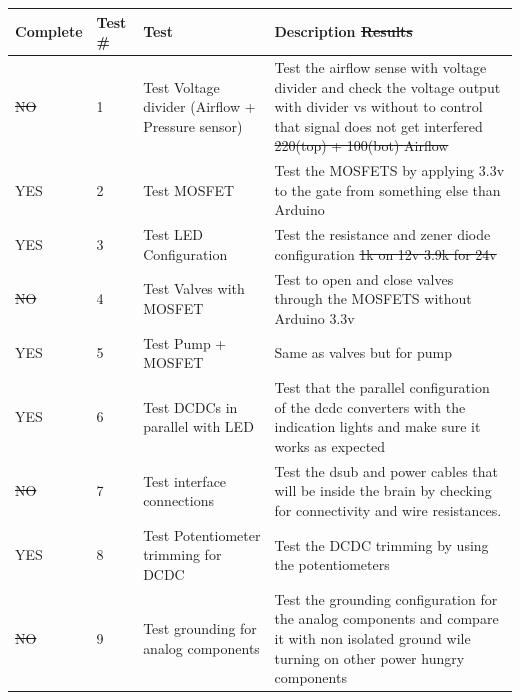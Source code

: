 \documentclass[a4paper,12pt,oneside]{article} %
\providecommand{\DIFaddtex}[1]{{\protect\color{blue}\uwave{#1}}} %
\providecommand{\DIFdeltex}[1]{{\protect\color{red}\sout{#1}}}                      %
\providecommand{\DIFdelbegin}{} %
\providecommand{\DIFaddFL}[1]{\DIFadd{#1}} %
\providecommand{\DIFdelFL}[1]{\DIFdel{#1}} %
\providecommand{\DIFaddbeginFL}{} %
\providecommand{\DIFaddendFL}{} %
\providecommand{\DIFdelbeginFL}{} %
\providecommand{\DIFdelendFL}{} %
\providecommand{\DIFadd}[1]{\texorpdfstring{\DIFaddtex{#1}}{#1}} %
\providecommand{\DIFdel}[1]{\texorpdfstring{\DIFdeltex{#1}}{}} %
\newcommand{\DIFscaledelfig}{0.5}
\newlength{\DIFdelgraphicswidth} %
\newlength{\DIFdelgraphicsheight} %
\newcommand{\DIFaddincludegraphics}[2][]{{\color{blue}\fbox{\DIFOincludegraphics[#1]{#2}}}} %
\newcommand{\DIFdelincludegraphics}[2][]{%
\sbox{\DIFdelgraphicsbox}{\DIFOincludegraphics[#1]{#2}}%
\settoboxwidth{\DIFdelgraphicswidth}{\DIFdelgraphicsbox} %
\settoboxtotalheight{\DIFdelgraphicsheight}{\DIFdelgraphicsbox} %
\scalebox{\DIFscaledelfig}{%
\parbox[b]{\DIFdelgraphicswidth}{\usebox{\DIFdelgraphicsbox}\\[-\baselineskip] \rule{\DIFdelgraphicswidth}{0em}}\llap{\resizebox{\DIFdelgraphicswidth}{\DIFdelgraphicsheight}{%
\setlength{\unitlength}{\DIFdelgraphicswidth}%
\begin{picture}(1,1)%
\thicklines\linethickness{2pt} %
{\color[rgb]{1,0,0}\put(0,0){\framebox(1,1){}}}%
{\color[rgb]{1,0,0}\put(0,0){\line( 1,1){1}}}%
{\color[rgb]{1,0,0}\put(0,1){\line(1,-1){1}}}%
\end{picture}%
}\hspace*{3pt}}} %
} %
\DeclareRobustCommand{\DIFdelbegin}{\DIFOdelbegin \let\includegraphics\DIFdelincludegraphics} %
\DeclareRobustCommand{\DIFaddbeginFL}{\DIFOaddbeginFL \let\includegraphics\DIFaddincludegraphics} %
\DeclareRobustCommand{\DIFaddendFL}{\DIFOaddendFL \let\includegraphics\DIFOincludegraphics} %
\DeclareRobustCommand{\DIFdelbeginFL}{\DIFOdelbeginFL \let\includegraphics\DIFdelincludegraphics} %
\DeclareRobustCommand{\DIFdelendFL}{\DIFOaddendFL \let\includegraphics\DIFOincludegraphics} %
\begin{document}
\begin{appendices}
\DIFdelbegin %
\DIFdelendFL \DIFaddbeginFL \begin{longtable}{|m{}|m{}|m{}|m{}|}
\DIFaddendFL \hline
Complete & Test \# & Test & Description \DIFdelbeginFL %
\DIFdelFL{Results }\DIFdelendFL \\ \hline
\DIFdelbeginFL \DIFdelFL{NO }\DIFdelendFL \DIFaddbeginFL \DIFaddFL{YES }\DIFaddendFL & 1 & Test Voltage divider (Airflow + Pressure sensor) & Test the airflow sense with voltage divider and check the voltage output with divider vs without to control that signal does not get interfered \DIFdelbeginFL %
\DIFdelFL{220(top) + 100(bot) Airflow }\DIFdelendFL \\ \hline
YES & 2 & Test MOSFET & Test the MOSFETS by applying 3.3v to the gate from something else than Arduino \DIFdelbeginFL %
\DIFdelendFL \\ \hline
YES & 3 & Test LED Configuration & Test the resistance and zener diode configuration\DIFdelbeginFL %
\DIFdelFL{1k on 12v  3.9k for 24v }\DIFdelendFL \\ \hline
\DIFdelbeginFL \DIFdelFL{NO }\DIFdelendFL \DIFaddbeginFL \DIFaddFL{YES }\DIFaddendFL & 4 & Test Valves with MOSFET & Test to open and close valves through the MOSFETS without Arduino 3.3v  \DIFdelbeginFL %
\DIFdelendFL \\ \hline
YES & 5 & Test Pump + MOSFET & Same as valves but for pump  \DIFdelbeginFL %
\DIFdelendFL \\ \hline
YES & 6 & Test DCDCs in parallel with LED & Test that the parallel configuration of the dcdc converters with the indication lights and make sure it works as expected  \DIFdelbeginFL %
\DIFdelendFL \\ \hline
\DIFdelbeginFL \DIFdelFL{NO }\DIFdelendFL \DIFaddbeginFL \DIFaddFL{YES }\DIFaddendFL & 7 & Test interface connections & Test the dsub and power cables that will be inside the brain by checking for connectivity and wire resistances.  \DIFdelbeginFL %
\DIFdelendFL \\ \hline
YES & 8 & Test Potentiometer trimming for DCDC & Test the DCDC trimming by using the potentiometers \DIFdelbeginFL %
\DIFdelendFL \\ \hline
\DIFdelbeginFL \DIFdelFL{NO }\DIFdelendFL \DIFaddbeginFL \DIFaddFL{YES }\DIFaddendFL & 9 & Test grounding for analog components & Test the grounding configuration for the analog components and compare it with non isolated ground wile turning on other power hungry components \DIFaddbeginFL \\ \hline

\end{longtable}
\end{appendices}
\end{document}
